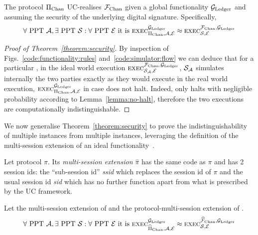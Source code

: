 \begin{theorem}
  \label{theorem:security}
  The protocol $\Pi_{\mathrm{Chan}}$ UC-realises $\mathcal{F}_{\mathrm{Chan}}$ given a global functionality
  $\mathcal{G}_{\mathrm{Ledger}}$ and assuming the security of the underlying digital signature.
  Specifically,
  \begin{gather*}
    \forall \text{ PPT } \mathcal{A}, \exists \text{ PPT } \mathcal{S}: \forall
    \text{ PPT } \mathcal{E} \text{ it is }
    \textsc{exec}^{\mathcal{G}_{\mathrm{Ledger}}}_{\Pi_{\mathrm{Chan}}, \mathcal{A}, \mathcal{E}} \approx
    \textsc{exec}^{\mathcal{F}_{\mathrm{Chan}}, \mathcal{G}_{\mathrm{Ledger}}}_{\mathcal{S}, \mathcal{E}}
  \end{gather*}
\end{theorem}

\begin{proof}[Proof of Theorem~\ref{theorem:security}]
  By inspection of Figs.~\ref{code:functionality:rules}
  and~\ref{code:simulator:flow} we can deduce that for a particular
  \environment, in the ideal world execution $\textsc{exec}^{\mathcal{F}_{\mathrm{Chan}},
  \mathcal{G}_{\mathrm{Ledger}}}_{\mathcal{S}_{\mathcal{A}}, \mathcal{E}}$, $\mathcal{S}_{\mathcal{A}}$
  simulates internally the two \pchan parties exactly as they would execute
  in the real world execution, $\textsc{exec}^{\mathcal{G}_{\mathrm{Ledger}}}_{\Pi_{\mathrm{Chan}},
  \mathcal{A}, \mathcal{E}}$ in case \fchan does not halt. Indeed, \fchan only
  halts with negligible probability according to Lemma~\ref{lemma:no-halt},
  therefore the two executions are computationally indistinguishable.
\end{proof}

We now generalise Theorem~\ref{theorem:security} to prove the
indistinguishability of multiple \fchan instances from multiple \pchan
instances, leveraging the definition of the multi-session extension of an ideal
functionality~\cite{DBLP:conf/crypto/CanettiR03}.

\begin{definition}
  Let protocol $\pi$. Its \emph{multi-session extension} $\hat{\pi}$ has the
  same code as $\pi$ and has 2 session ids: the ``sub-session id''
  \emph{ssid} which replaces the session id of $\pi$ and the usual session id
  \emph{sid} which has no further function apart from what is prescribed by the
  UC framework.
\end{definition}

\begin{theorem}
  \label{theorem:multi-session-security}
  Let \fchanhat the multi-session extension of \fchan and \pchanhat the
  protocol-multi-session extension of \pchan.
  \begin{gather*}
    \forall \text{ PPT } \mathcal{A}, \exists \text{
    PPT } \mathcal{S}: \forall \text{ PPT } \mathcal{E} \text{ it is }
    \textsc{exec}^{\mathcal{G}_{\mathrm{Ledger}}}_{\widehat{\Pi}_{\mathrm{Chan}}, \mathcal{A}, \mathcal{E}} \approx
    \textsc{exec}^{\widehat{\mathcal{F}}_{\mathrm{Chan}}, \mathcal{G}_{\mathrm{Ledger}}}_{\mathcal{S}, \mathcal{E}}
  \end{gather*}
\end{theorem}

